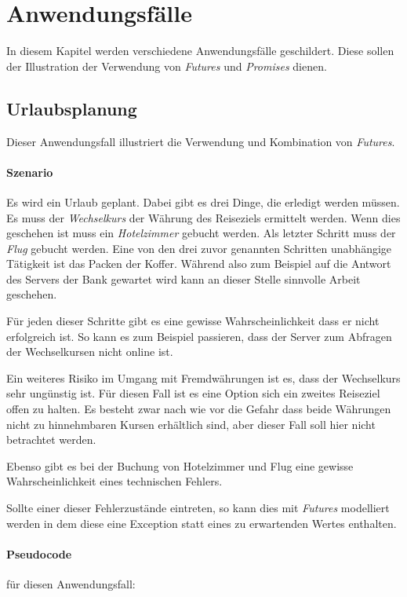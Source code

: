 \section{Anwendungsfälle}

In diesem Kapitel werden verschiedene Anwendungsfälle geschildert.
Diese sollen der Illustration der Verwendung von \emph{Futures} und
\emph{Promises} dienen.

\subsection{Urlaubsplanung}

Dieser Anwendungsfall illustriert die Verwendung und Kombination
von \emph{Futures}.

\paragraph{Szenario}

Es wird ein Urlaub geplant. Dabei gibt es drei Dinge, die erledigt
werden müssen. Es muss der \emph{Wechselkurs} der Währung des
Reiseziels ermittelt werden. Wenn dies geschehen ist muss ein
\emph{Hotelzimmer} gebucht werden. Als letzter Schritt muss der
\emph{Flug} gebucht werden. Eine von den drei zuvor genannten
Schritten unabhängige Tätigkeit ist das Packen der Koffer. Während
also zum Beispiel auf die Antwort des Servers der Bank gewartet wird
kann an dieser Stelle sinnvolle Arbeit geschehen.

Für jeden dieser Schritte gibt es eine gewisse Wahrscheinlichkeit
dass er nicht erfolgreich ist. So kann es zum Beispiel passieren,
dass der Server zum Abfragen der Wechselkursen nicht online ist.

Ein weiteres Risiko im Umgang mit Fremdwährungen ist es, dass der
Wechselkurs sehr ungünstig ist. Für diesen Fall ist es eine Option
sich ein zweites Reiseziel offen zu halten. Es besteht zwar nach wie
vor die Gefahr dass beide Währungen nicht zu hinnehmbaren Kursen
erhältlich sind, aber dieser Fall soll hier nicht betrachtet werden.

Ebenso gibt es bei der Buchung von Hotelzimmer und Flug eine gewisse
Wahrscheinlichkeit eines technischen Fehlers.

Sollte einer dieser Fehlerzustände eintreten, so kann dies mit
\emph{Futures} modelliert werden in dem diese eine Exception
statt eines zu erwartenden Wertes enthalten.

\paragraph{Pseudocode} für diesen Anwendungsfall:

